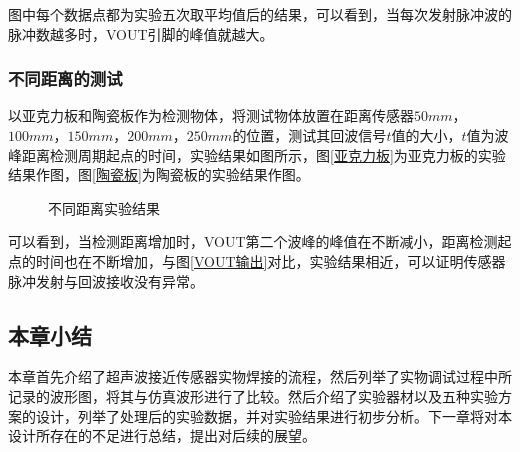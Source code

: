 图中每个数据点都为实验五次取平均值后的结果，可以看到，当每次发射脉冲波的脉冲数越多时，VOUT引脚的峰值就越大。

\subsubsection{不同距离的测试}
以亚克力板和陶瓷板作为检测物体，将测试物体放置在距离传感器$50mm$，$100mm$，$150mm$，$200mm$，$250mm$的位置，测试其回波信号$t$值的大小，$t$值为波峰距离检测周期起点的时间，实验结果如图所示，图\ref{亚克力板}为亚克力板的实验结果作图，图\ref{陶瓷板}为陶瓷板的实验结果作图。
\begin{figure}[!h]
	\centering
	\caption{不同距离实验结果}
	\label{不同距离实验结果}
\end{figure}
可以看到，当检测距离增加时，VOUT第二个波峰的峰值在不断减小，距离检测起点的时间也在不断增加，与图\ref{VOUT输出}对比，实验结果相近，可以证明传感器脉冲发射与回波接收没有异常。
\subsection{本章小结}
本章首先介绍了超声波接近传感器实物焊接的流程，然后列举了实物调试过程中所记录的波形图，将其与仿真波形进行了比较。然后介绍了实验器材以及五种实验方案的设计，列举了处理后的实验数据，并对实验结果进行初步分析。下一章将对本设计所存在的不足进行总结，提出对后续的展望。







